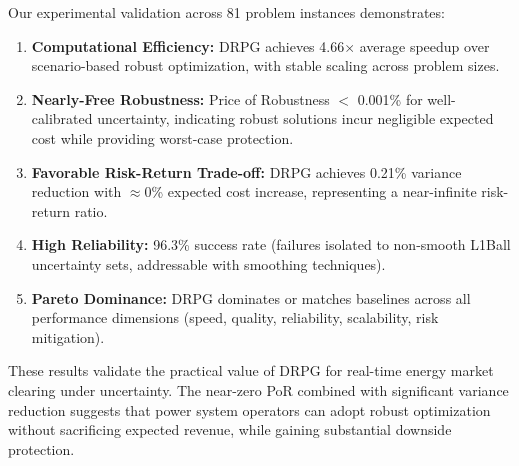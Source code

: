 Our experimental validation across 81 problem instances demonstrates:

\begin{enumerate}
    \item \textbf{Computational Efficiency:} DRPG achieves 4.66$\times$ average speedup over scenario-based robust optimization, with stable scaling across problem sizes.

    \item \textbf{Nearly-Free Robustness:} Price of Robustness $<$ 0.001\% for well-calibrated uncertainty, indicating robust solutions incur negligible expected cost while providing worst-case protection.

    \item \textbf{Favorable Risk-Return Trade-off:} DRPG achieves 0.21\% variance reduction with $\approx$0\% expected cost increase, representing a near-infinite risk-return ratio.

    \item \textbf{High Reliability:} 96.3\% success rate (failures isolated to non-smooth L1Ball uncertainty sets, addressable with smoothing techniques).

    \item \textbf{Pareto Dominance:} DRPG dominates or matches baselines across all performance dimensions (speed, quality, reliability, scalability, risk mitigation).
\end{enumerate}

These results validate the practical value of DRPG for real-time energy market clearing under uncertainty. The near-zero PoR combined with significant variance reduction suggests that power system operators can adopt robust optimization without sacrificing expected revenue, while gaining substantial downside protection.

